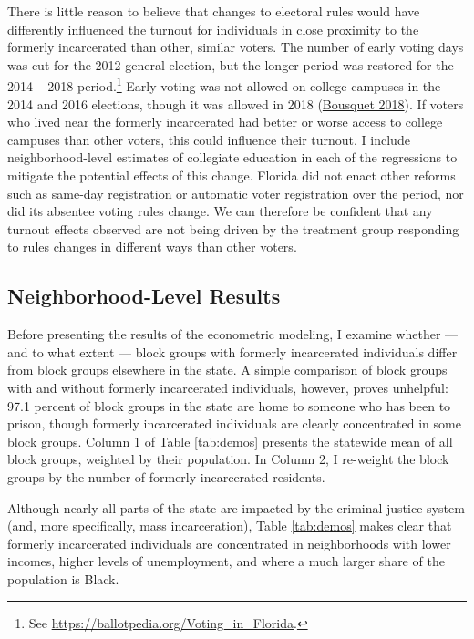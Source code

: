 \documentclass[
  12pt,
]{article}
\begin{document}
There is little reason to believe that changes to electoral rules would have differently influenced the turnout for individuals in close proximity to the formerly incarcerated than other, similar voters. The number of early voting days was cut for the 2012 general election, but the longer period was restored for the 2014 -- 2018 period.\footnote{See \url{https://ballotpedia.org/Voting_in_Florida}.} Early voting was not allowed on college campuses in the 2014 and 2016 elections, though it was allowed in 2018 (\protect\hyperlink{ref-Bousquet2018a}{Bousquet 2018}). If voters who lived near the formerly incarcerated had better or worse access to college campuses than other voters, this could influence their turnout. I include neighborhood-level estimates of collegiate education in each of the regressions to mitigate the potential effects of this change. Florida did not enact other reforms such as same-day registration or automatic voter registration over the period, nor did its absentee voting rules change. We can therefore be confident that any turnout effects observed are not being driven by the treatment group responding to rules changes in different ways than other voters.

\hypertarget{neighborhood-level-results}{%
\subsection*{Neighborhood-Level Results}\label{neighborhood-level-results}}

Before presenting the results of the econometric modeling, I examine whether --- and to what extent --- block groups with formerly incarcerated individuals differ from block groups elsewhere in the state. A simple comparison of block groups with and without formerly incarcerated individuals, however, proves unhelpful: 97.1 percent of block groups in the state are home to someone who has been to prison, though formerly incarcerated individuals are clearly concentrated in some block groups. Column 1 of Table \ref{tab:demos} presents the statewide mean of all block groups, weighted by their population. In Column 2, I re-weight the block groups by the number of formerly incarcerated residents.



Although nearly all parts of the state are impacted by the criminal justice system (and, more specifically, mass incarceration), Table \ref{tab:demos} makes clear that formerly incarcerated individuals are concentrated in neighborhoods with lower incomes, higher levels of unemployment, and where a much larger share of the population is Black.
\end{document}
